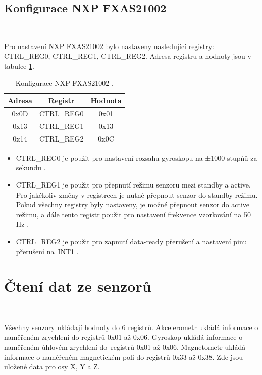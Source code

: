 \subsection{Konfigurace NXP FXAS21002}\

Pro nastavení NXP FXAS21002 bylo nastaveny nasledující registry: CTRL\_REG0,
CTRL\_REG1, CTRL\_REG2. Adresa registru a hodnoty jsou v tabulce
\ref{tab:FXAS21002}.

\begin{table}[!h]
    \centering
    \begin{tabular}{ccc}
        \hline
        \textbf{Adresa} & \textbf{Registr} & \textbf{Hodnota} \\
        \hline
        0x0D            & CTRL\_REG0       & 0x01             \\
        0x13            & CTRL\_REG1       & 0x13             \\
        0x14            & CTRL\_REG2       & 0x0C             \\
        \hline
    \end{tabular}
    \caption{Konfigurace NXP FXAS21002 \cite{FXAS21002}.}
    \label{tab:FXAS21002}
\end{table}

\begin{itemize}
    \item CTRL\_REG0 je použit pro nastavení rozsahu gyroskopu na ±1000 stupňů za
    sekundu \cite{FXAS21002}.

    \item CTRL\_REG1 je použit pro přepnutí režimu senzoru mezi standby a active.
    Pro jakékoliv změny v registrech je nutné přepnout senzor do standby režimu.
    Pokud všechny registry byly nastaveny, je možné přepnout senzor do active
    režimu, a dále tento registr použit pro nastavení frekvence vzorkování na 50
    Hz \cite{FXAS21002}.

    \item CTRL\_REG2 je použit pro zapnutí data-ready přerušení a nastavení pinu
    přerušení na~INT1 \cite{FXAS21002}.
\end{itemize}

\section{Čtení dat ze senzorů}\

Všechny senzory ukládají hodnoty do 6 registrů. Akcelerometr ukládá informace o
naměřeném zrychlení do registrů 0x01 až 0x06. Gyroskop ukládá informace o naměřeném
úhlovém zrychlení do~registrů 0x01 až 0x06. Magnetometr ukládá informace o naměřeném
magnetickém poli do registrů 0x33 až 0x38. Zde jsou uložené data pro osy X, Y a Z.

